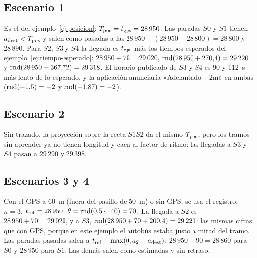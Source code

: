 \begin{table}[ht]
\end{table}

\subsection{Escenario 1} Es el del ejemplo~\ref{ej:posicion}: $T_{\mathrm{pos}}=t_{\mathrm{gps}}=28\,950$. Las paradas $S0$ y $S1$ tienen
$a_{\mathrm{dest}}<T_{\mathrm{pos}}$ y salen como pasadas a las $28\,950-(28\,950-28\,800)=28\,800$ y $28\,890$. Para $S2$, $S3$ y $S4$ la
llegada es $t_{\mathrm{gps}}$ más los tiempos esperados del ejemplo~\ref{ej:tiempo-esperado}: $28\,950+70=29\,020$,
$\operatorname{rnd}(28\,950+270{,}4)=29\,220$ y $\operatorname{rnd}(28\,950+367{,}72)=29\,318$. El horario publicado de $S3$ y $S4$ es
90 y 112~s más lento de lo esperado, y la aplicación anunciaría «Adelantado $-2$m» en ambas
($\operatorname{rnd}(-1{,}5)=-2$ y $\operatorname{rnd}(-1{,}87)=-2$).

\subsection{Escenario 2} Sin trazado, la proyección sobre la recta $S1S2$ da el mismo $T_{\mathrm{pos}}$, pero los tramos sin
aprender ya no tienen longitud y caen al factor de ritmo: las llegadas a $S3$ y $S4$ pasan a $29\,290$ y $29\,398$.

\subsection{Escenarios 3 y 4} Con el GPS a 60~m (fuera del pasillo de 50~m) o sin GPS, se usa el registro: $n=3$,
$t_{\mathrm{ref}}=28\,950$, $\theta=\operatorname{rnd}(0{,}5\cdot140)=70$. La llegada a $S2$ es $28\,950+70=29\,020$, y a $S3$,
$\operatorname{rnd}(28\,950+70+200{,}4)=29\,220$: las mismas cifras que con GPS, porque en este ejemplo el autobús estaba
justo a mitad del tramo. Las paradas pasadas salen a $t_{\mathrm{ref}}-\max(0,a_2-a_{\mathrm{dest}})$: $28\,950-90=28\,860$ para $S0$ y
$28\,950$ para $S1$. Las demás salen como estimadas y sin retraso.

